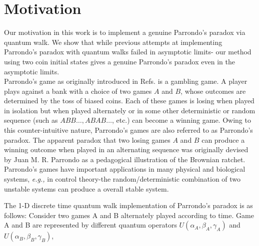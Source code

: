 \documentclass[english,aps,pra,amsmath,amssymb,showpacs,notitlepage,onecolumn]{revtex4-1}
\begin{document}
\section{Motivation}
Our motivation in this work is to implement a genuine Parrondo's paradox via quantum walk. We show that while previous attempts at implementing Parrondo's paradox with quantum walks failed in asymptotic limits\cite{flitney}-\cite{minli} our method using two coin initial states gives a genuine Parrondo's paradox even in the asymptotic limits.
\\
Parrondo's game as originally introduced in Refs.\cite{Harmer,Parrondo} is a gambling game. A player plays against a bank with a choice of two games $A$ and $B$, whose outcomes are determined by the toss of biased coins. Each of these games is losing when played in isolation but when played alternately or in some other deterministic or random sequence (such as $ABB\ldots, ABAB\ldots$, etc.) can become a winning game. Owing to this counter-intuitive nature, Parrondo's games are also referred to as Parrondo's paradox. The apparent paradox that two losing games $A$ and $B$ can produce a winning outcome when played in an alternating sequence was originally devised by Juan M. R. Parrondo as a pedagogical illustration of the Brownian ratchet\cite{Parrondo}. Parrondo's games have important applications in many physical and biological systems, \emph{e.g.,} in control theory-the random/deterministic combination of two unstable systems can produce a overall stable system\cite{control}.

The 1-D discrete time quantum walk implementation of Parrondo's paradox is as follows:
Consider two games A and B  alternately played according to time. Game A and B are represented by different quantum operators $U(\alpha_{A},\beta_{A},\gamma_{A})$ and $U(\alpha_{B},\beta_{B},\gamma_{B})$,
\end{document}
